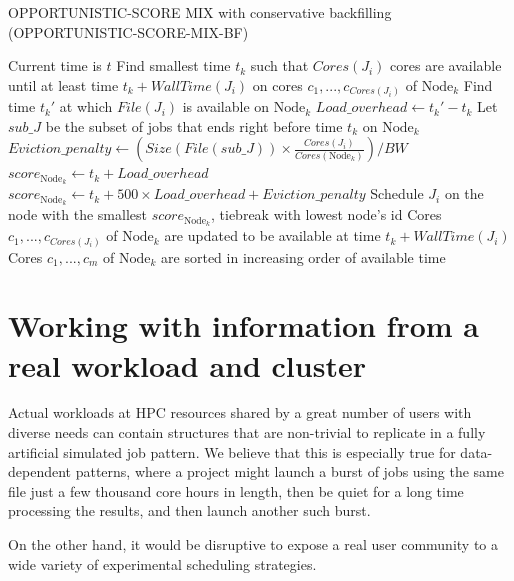 \documentclass[conference,10pt]{IEEEtran}
\newcommand{\Node}[1]{\ensuremath{\mathrm{Node}_{#1}}\xspace}
\newcommand{\file}{\ensuremath{\mathit{File}}\xspace}
\newcommand{\size}{\ensuremath{\mathit{Size}}\xspace}
\newcommand{\bandwidth}{\mathit{BW}\xspace}
\newcommand{\core}{\mathit{Cores}\xspace}
\newcommand{\walltime}{\mathit{WallTime}\xspace}
\newcommand{\nodeset}{\ensuremath{\mathbb{N}}\xspace}
\begin{document}
\begin{algorithm*}[htb]%
\caption{OPPORTUNISTIC-SCORE MIX with conservative backfilling (OPPORTUNISTIC-SCORE-MIX-BF)}
\begin{algorithmic}[1]
	\Statex Current time is $t$
		\ForEach{$\Node{k} \in \nodeset$}
			\State Find smallest time $t_k$ such that $\core(J_i)$ cores are available until at least time $t_k + \walltime(J_i)$ on cores $c_1, ..., c_{\core(J_i)}$ of $\Node{k}$
			\State Find time $t_k'$ at which $\file(J_i)$ is available on $\Node{k}$
			\State $Load\_overhead \gets t_k' - t_k$ 
			\State Let $\mathit{sub\_J}$ be the subset of jobs that ends right before time $t_k$ on $\Node{k}$
			\State $Eviction\_penalty \gets (\size(\file(\mathit{sub\_J})) \times \frac{\core(J_i)}{\core(\Node{k})})/\bandwidth$
				\State $score_{\Node{k}} \gets t_k + Load\_overhead$
			\Else
				\State $score_{\Node{k}} \gets t_k + 500 \times Load\_overhead + Eviction\_penalty$
			\EndIf
		\EndFor
		\State Schedule $J_i$ on the node with the smallest $score_{\Node{k}}$, tiebreak with lowest node's id
		\State Cores $c_1, ..., c_{\core(J_i)}$ of $\Node{k}$ are updated to be available at time $t_k + \walltime(J_i)$
		\State Cores $c_1, ..., c_m$ of $\Node{k}$ are sorted in increasing order of available time
	\EndFor
\end{algorithmic}
\end{algorithm*}

\section{Working with information from a real workload and cluster}\label{sec.working}
Actual workloads at HPC resources shared by a great number of users with diverse needs can contain structures
that are non-trivial to replicate in a fully artificial simulated job pattern. We believe that this is especially
true for data-dependent patterns, where a project might launch a burst of jobs using the same file just a few thousand
core hours in length, then be quiet for a long time processing the results, and then launch another such burst.

On the other hand, it would be disruptive to expose a real user community to a wide variety of experimental scheduling strategies.
\end{document}
